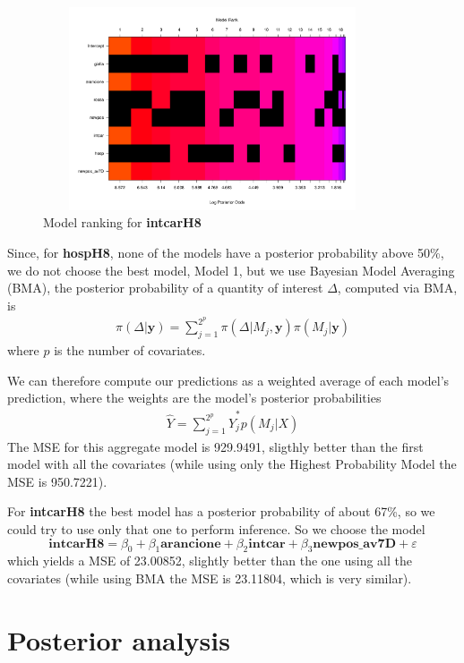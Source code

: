 \documentclass[12pt,a4paper]{article}
\theoremstyle{definition}
\theoremstyle{remark}
\begin{document}
\begin{figure}[!htb]
	\centering
	\includegraphics[width=100mm, height=60mm,scale=0.5]{ranking2.pdf}
	\caption{Model ranking for \textbf{intcarH8} }
\end{figure}

Since, for \textbf{hospH8}, none of the models have a posterior probability above 50\%, we do not choose the best model, Model 1, but we use Bayesian Model Averaging (BMA), the posterior probability of a quantity of interest $\Delta$, computed via BMA, is
\begin{align*}
	\pi(\Delta|\mathbf{y}) = \sum_{j=1}^{2^p}\pi(\Delta| M_j, \mathbf{y})\pi(M_j|\mathbf{y})
\end{align*}
where $p$ is the number of covariates.

We can therefore compute our predictions as a weighted average of each model's prediction, where the weights are the model's posterior probabilities
\begin{align*}
	\hat{Y} = \sum_{j=1}^{2^p}\hat{Y}^*_jp(M_j|X)
\end{align*}
The MSE for this aggregate model is 929.9491, sligthly better than the first model with all the covariates (while using only the Highest Probability Model the MSE is 950.7221).


For \textbf{intcarH8} the best model has a posterior probability of about 67\%, so we could try to use only that one to perform inference. So we choose the model
\begin{dmath*}
	\textbf{intcarH8} = \beta_0 + \beta_1\textbf{arancione} +  \beta_2\textbf{intcar} + \beta_3\textbf{newpos\_av7D} + \varepsilon
\end{dmath*}
which yields a MSE of 23.00852, slightly better than the one using all the covariates (while using BMA the MSE is 23.11804, which is very similar).

\newpage
\section{Posterior analysis}
\end{document}
